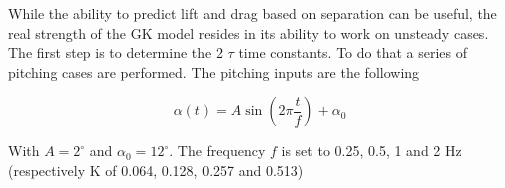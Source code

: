 \par While the ability to predict lift and drag based on separation can be useful, the real strength of the GK model resides in its ability to work on unsteady cases.
The first step is to determine the 2 $\tau$ time constants. 
To do that a series of pitching cases are performed. 
The pitching inputs are the following

\begin{equation}
	\alpha\left( t \right)= A \sin \left( 2 \pi \frac{t}{f} \right) + \alpha_0
	\label{eqn:pitch_input}
\end{equation}

With $A=2^\circ$ and $\alpha_0=12^\circ$.
The frequency $f$ is set to 0.25, 0.5, 1 and 2 Hz (respectively K of 0.064, 0.128, 0.257 and 0.513)


